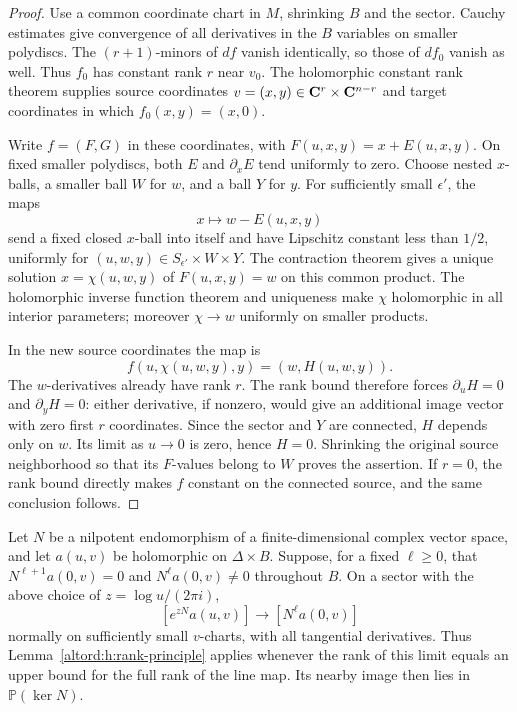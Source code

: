 \begin{proof}
Use a common coordinate chart in $M$, shrinking $B$ and the sector.
Cauchy estimates give convergence of all derivatives in the $B$
variables on smaller polydiscs. The $(r+1)$-minors of $df$ vanish
identically, so those of $df_0$ vanish as well. Thus $f_0$ has constant
rank $r$ near $v_0$. The holomorphic constant rank theorem supplies
source coordinates $v=(x,y)\in\mathbf C^r\times\mathbf C^{n-r}$ and target
coordinates in which $f_0(x,y)=(x,0)$.

Write $f=(F,G)$ in these coordinates, with
$F(u,x,y)=x+E(u,x,y)$. On fixed smaller polydiscs, both $E$ and
$\partial_xE$ tend uniformly to zero. Choose nested $x$-balls, a
smaller ball $W$ for $w$, and a ball $Y$ for $y$. For sufficiently
small $\epsilon'$, the maps
\[
 x\longmapsto w-E(u,x,y)
\]
send a fixed closed $x$-ball into itself and have Lipschitz constant
less than $1/2$, uniformly for
$(u,w,y)\in S_{\epsilon'}\times W\times Y$.
The contraction theorem gives a unique solution
$x=\chi(u,w,y)$ of $F(u,x,y)=w$ on this common product.
The holomorphic inverse function theorem and uniqueness make $\chi$
holomorphic in all interior parameters; moreover $\chi\to w$
uniformly on smaller products.

In the new source coordinates the map is
\[
 f(u,\chi(u,w,y),y)=(w,H(u,w,y)).
\]
The $w$-derivatives already have rank $r$.
The rank bound therefore forces $\partial_uH=0$ and
$\partial_yH=0$: either derivative, if nonzero, would give an
additional image vector with zero first $r$ coordinates.
Since the sector and $Y$ are connected, $H$ depends only on $w$.
Its limit as $u\to0$ is zero, hence $H=0$.
Shrinking the original source neighborhood so that its $F$-values
belong to $W$ proves the assertion. If $r=0$, the rank bound directly
makes $f$ constant on the connected source, and the same conclusion
follows.
\end{proof}

\begin{lemma}\label{altord:h:nilpotent-limit}
Let $N$ be a nilpotent endomorphism of a finite-dimensional complex
vector space, and let $a(u,v)$ be holomorphic on $\Delta\times B$.
Suppose, for a fixed $\ell\ge0$, that
$N^{\ell+1}a(0,v)=0$ and $N^\ell a(0,v)\ne0$ throughout $B$.
On a sector with the above choice of $z=\log u/(2\pi i)$,
\begin{equation}\label{altord:h:eq-nilpotent-limit}
 [e^{zN}a(u,v)]\longrightarrow[N^\ell a(0,v)]
\end{equation}
normally on sufficiently small $v$-charts, with all tangential
derivatives. Thus Lemma~\ref{altord:h:rank-principle} applies whenever the
rank of this limit equals an upper bound for the full rank of the
line map. Its nearby image then lies in $\mathbb P(\ker N)$.
\end{lemma}

